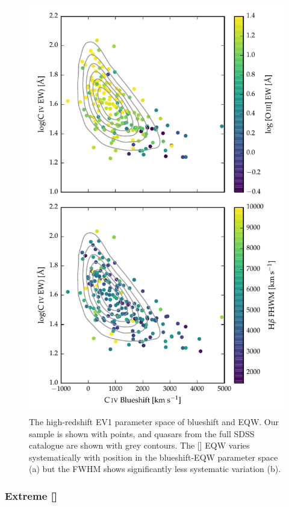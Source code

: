 \begin{figure}
    \includegraphics[width=\columnwidth]{figures/chapter04/ev1.pdf} 
    \caption{The high-redshift \ac{EV1} parameter space of  blueshift and \ac{EQW}. Our sample is shown with points, and quasars from the full \ac{SDSS} catalogue are shown with grey contours. The [] EQW varies systematically with position in the  blueshift-\ac{EQW} parameter space (a) but the \hb \ac{FWHM} shows significantly less systematic variation (b).}      
    \label{fig:ev1}
\end{figure}

\subsubsection{Extreme []}

